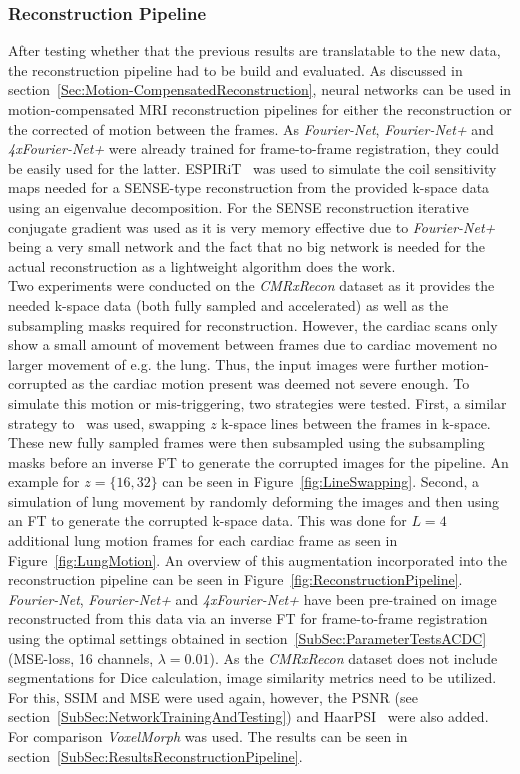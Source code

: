 \subsubsection{Reconstruction Pipeline} \label{SubSubSec:ReconstructionPipeline}
After testing whether that the previous results are translatable to the new data, the reconstruction pipeline had to be build and evaluated. As discussed in section~\ref{Sec:Motion-CompensatedReconstruction}, neural networks can be used in motion-compensated MRI reconstruction pipelines for either the reconstruction or the corrected of motion between the frames. As \emph{Fourier-Net}, \emph{Fourier-Net+} and \emph{4xFourier-Net+} were already trained for frame-to-frame registration, they could be easily used for the latter. ESPIRiT~\cite{ESPIRiT} was used to simulate the coil sensitivity maps needed for a SENSE-type reconstruction from the provided k-space data using an eigenvalue decomposition. For the SENSE reconstruction iterative conjugate gradient was used as it is very memory effective due to \emph{Fourier-Net+} being a very small network and the fact that no big network is needed for the actual reconstruction as a lightweight algorithm does the work. \\ 
Two experiments were conducted on the \emph{CMRxRecon} dataset as it provides the needed k-space data (both fully sampled and accelerated) as well as the subsampling masks required for reconstruction. However, the cardiac scans only show a small amount of movement between frames due to cardiac movement no larger movement of e.g. the lung. Thus, the input images were further motion-corrupted as the cardiac motion present was deemed not severe enough. To simulate this motion or mis-triggering, two strategies were tested. First, a similar strategy to~\cite{Oksuz2020} was used, swapping $z$ k-space lines between the frames in k-space. These new fully sampled frames were then subsampled using the subsampling masks before an inverse FT to generate the corrupted images for the pipeline. An example for $z=\{16,32\}$ can be seen in Figure~\ref{fig:LineSwapping}. Second, a simulation of lung movement by randomly deforming the images and then using an FT to generate the corrupted k-space data. This was done for $L=4$ additional lung motion frames for each cardiac frame as seen in Figure~\ref{fig:LungMotion}. An overview of this augmentation incorporated into the reconstruction pipeline can be seen in Figure~\ref{fig:ReconstructionPipeline}.\\
\emph{Fourier-Net}, \emph{Fourier-Net+} and \emph{4xFourier-Net+} have been pre-trained on image reconstructed from this data via an inverse FT for frame-to-frame registration using the optimal settings obtained in section~\ref{SubSec:ParameterTestsACDC} (MSE-loss, 16 channels, $\lambda=0.01$). As the \emph{CMRxRecon} dataset does not include segmentations for Dice calculation, image similarity metrics need to be utilized. For this, SSIM and MSE were used again, however, the PSNR (see section~\ref{SubSec:NetworkTrainingAndTesting}) and HaarPSI~\cite{HaarPSI} were also added. For comparison \emph{VoxelMorph} was used. The results can be seen in section~\ref{SubSec:ResultsReconstructionPipeline}.


